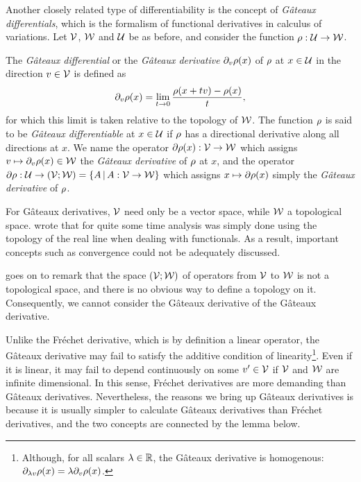 Another closely related type of differentiability is the concept of \emph{Gâteaux differentials}, which is the formalism of functional derivatives in calculus of variations.
Let ${\mathcal V}$, ${\mathcal W}$ and ${\mathcal U}$ be as before, and consider the function $\rho :{\mathcal U}\to{\mathcal W}$.

\begin{definition}
  The \emph{Gâteaux differential} or the \emph{Gâteaux derivative} $\partial_v \rho(x)$ of $\rho$ at $x \in {\mathcal U}$ in the direction $v\in{\mathcal V}$ is defined as
  \[
    \partial_v \funder(x) = \lim_{t \to 0} \frac{\funder(x + t v) - \funder(x)}{t},  %
  \]  
  for which this limit is taken relative to the topology of ${\mathcal W}$.
  The function $\rho$ is said to be \emph{Gâteaux differentiable} at $x\in{\mathcal U}$ if $\rho$ has a directional derivative along all directions at $x$.
  We name the operator $\partial \rho(x):{\mathcal V}\to{\mathcal W}$ which assigns $v \mapsto \partial_v \rho(x) \in {\mathcal W}$ the \emph{Gâteaux derivative} of $\rho$ at $x$, and the operator $\partial \rho :{\mathcal U}\to({\mathcal V};{\mathcal W}) = \{A \,|\, A:{\mathcal V}\to{\mathcal W} \}$ which assigns $x \mapsto \partial \rho(x)$ simply the \emph{Gâteaux derivative} of $\rho$.
  
\end{definition}

\begin{remark}
  For Gâteaux derivatives, ${\mathcal V}$ need only be a vector space, while ${\mathcal W}$ a topological space.
  \citet[p. 55]{tapia1971diff} wrote that for quite some time analysis was simply done using the topology of the real line when dealing with functionals.
  As a result, important concepts such as convergence could not be adequately discussed.
\end{remark}

\begin{remark}
  \citet[p. 52]{tapia1971diff} goes on to remark that the space $({\mathcal V};{\mathcal W})$ of operators from ${\mathcal V}$ to ${\mathcal W}$ is not a topological space, and there is no obvious way to define a topology on it.
  Consequently, we cannot consider the Gâteaux derivative of the Gâteaux derivative.
\end{remark}

Unlike the Fréchet derivative, which is by definition a linear operator, the Gâteaux derivative may fail to satisfy the additive condition of linearity\footnote{Although, for all scalars $\lambda \in \mathbb{R}$, the Gâteaux derivative is homogenous: $\partial_{\lambda v}\rho(x) = \lambda \partial_v \rho(x)$.}.
Even if it is linear, it may fail to depend continuously on some $v'\in{\mathcal V}$ if ${\mathcal V}$ and ${\mathcal W}$ are infinite dimensional.
In this sense, Fréchet derivatives are more demanding than Gâteaux derivatives.
Nevertheless, the reasons we bring up Gâteaux derivatives is because it is usually simpler to calculate Gâteaux derivatives than Fréchet derivatives, and the two concepts are connected by the lemma below.

